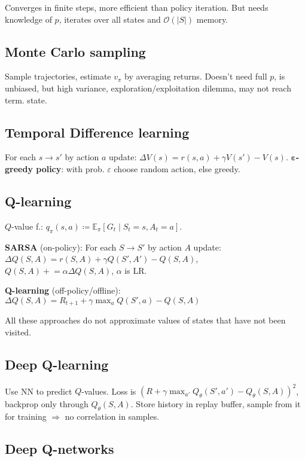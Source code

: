 \documentclass[11pt,landscape,a4paper,fleqn]{article}
\newcommand{\E}{\mathbb{E}}
\begin{document}
\begin{multicols*}{4}
Converges in finite steps, more efficient than policy iteration.
But needs knowledge of $p$,
iterates over all states and $\mathcal{O}(|S|)$ memory.

\subsection{Monte Carlo sampling}

Sample trajectories, estimate $v_\pi$ by averaging returns.
Doesn't need full $p$, is unbiased,
but high variance, exploration/exploitation dilemma, may not reach term. state.

\subsection{Temporal Difference learning}

For each $s \to s'$ by action $a$ update:
$\Delta V(s) = r(s, a) + \gamma V(s') - V(s)$.
\textbf{$\bm\varepsilon$-greedy policy}: with prob. $\varepsilon$ choose random action, else greedy.

\subsection{Q-learning}

$Q$-value f.: $q_\pi(s, a) \coloneqq \E_\pi[G_t \mid S_t = s, A_t = a]$.

\textbf{SARSA} (on-policy):
For each $S \to S'$ by action $A$ update:
$\Delta Q(S, A) = r(S, A) + \gamma Q(S', A') - Q(S, A)$,
$Q(S, A) {}+{}\!\!\!= \alpha \Delta Q(S, A)$,
$\alpha$ is LR.

\textbf{Q-learning} (off-policy/offline):
$\Delta Q(S, A) = R_{t+1} + \gamma \max_a Q(S', a) - Q(S, A)$

All these approaches do not approximate values of states that have not been visited.

\subsection{Deep Q-learning}

Use NN to predict $Q$-values.
Loss is $(R + \gamma \max_{a'}Q_\theta(S', a') - Q_\theta(S, A))^2$,
backprop only through $Q_\theta(S, A)$.
Store history in replay buffer, sample from it for training $ \Rightarrow $ no correlation in samples.

\subsection{Deep Q-networks}


\end{multicols*}
\end{document}
